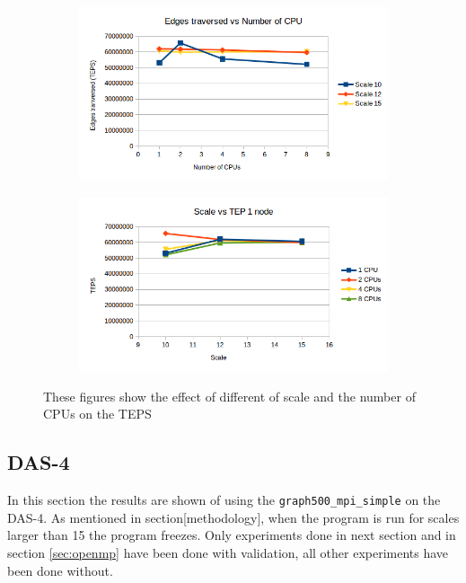 \begin{figure}[!h]
\centering
\begin{subfigure}{.5\textwidth}
  \centering
  \includegraphics[width=\linewidth]{images/openmp_cpus.png}
\end{subfigure}%
\begin{subfigure}{.5\textwidth}
  \centering
  \includegraphics[width=\linewidth]{images/openmp_scale.png}
\end{subfigure}
\caption{These figures show the effect of different of scale and the number of CPUs on the TEPS}
\label{fig:openmp_scale_cpu}
\end{figure}

\subsection{DAS-4}
In this section the results are shown of using the \texttt{graph500\_mpi\_simple} on the DAS-4. As mentioned in section[methodology], when the program is run for scales larger than 15 the program freezes. Only experiments done in next section and in section \ref{sec:openmp} have been done with validation, all other experiments have been done without.

